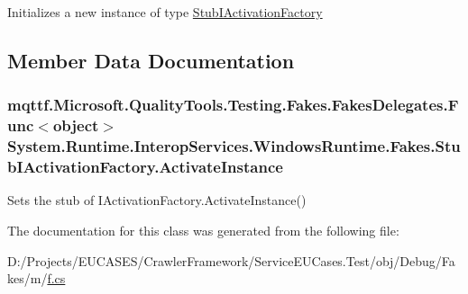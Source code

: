 Initializes a new instance of type \hyperlink{class_system_1_1_runtime_1_1_interop_services_1_1_windows_runtime_1_1_fakes_1_1_stub_i_activation_factory}{Stub\-I\-Activation\-Factory}



\subsection{Member Data Documentation}
\hypertarget{class_system_1_1_runtime_1_1_interop_services_1_1_windows_runtime_1_1_fakes_1_1_stub_i_activation_factory_af3c6dcfc6ee4cf523e755604fdc788d7}{
\subsubsection[{Activate\-Instance}]{\setlength{\rightskip}{0pt plus 5cm}mqttf.\-Microsoft.\-Quality\-Tools.\-Testing.\-Fakes.\-Fakes\-Delegates.\-Func$<$object$>$ System.\-Runtime.\-Interop\-Services.\-Windows\-Runtime.\-Fakes.\-Stub\-I\-Activation\-Factory.\-Activate\-Instance}}\label{class_system_1_1_runtime_1_1_interop_services_1_1_windows_runtime_1_1_fakes_1_1_stub_i_activation_factory_af3c6dcfc6ee4cf523e755604fdc788d7}


Sets the stub of I\-Activation\-Factory.\-Activate\-Instance()



The documentation for this class was generated from the following file\-:\begin{DoxyCompactItemize}
\item 
D\-:/\-Projects/\-E\-U\-C\-A\-S\-E\-S/\-Crawler\-Framework/\-Service\-E\-U\-Cases.\-Test/obj/\-Debug/\-Fakes/m/\hyperlink{m_2f_8cs}{f.\-cs}\end{DoxyCompactItemize}
